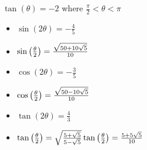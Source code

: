 \documentclass{ximera}
\begin{document}
\begin{question}
\begin{problem}
\begin{solution}
\begin{itemize}
\end{itemize}
\end{solution}
\end{problem}

\begin{problem}\label{doublehalflast}
$\tan(\theta) = -2$ where $\frac{\pi}{2} < \theta < \pi$

\begin{solution}
\begin{itemize}

\item $\sin(2\theta) = -\frac{4}{5}$
\item $\sin\left(\frac{\theta}{2}\right) = \frac{\sqrt{50+10\sqrt{5}}}{10} \\ \phantom{\tan\left(\frac{\theta}{2}\right) =\frac{5-5\sqrt{5}}{10}}$ 

\item $\cos(2\theta) = -\frac{3}{5}$
\item $\cos\left(\frac{\theta}{2}\right)= \frac{\sqrt{50-10\sqrt{5}}}{10} \\ \phantom{\tan\left(\frac{\theta}{2}\right) =\frac{5-5\sqrt{5}}{10}}$ 
\item $\tan(2\theta)=\frac{4}{3}$
\item $\tan\left(\frac{\theta}{2}\right) =  \sqrt{\frac{5+\sqrt{5}}{5-\sqrt{5}}} \\ \tan\left(\frac{\theta}{2}\right) =\frac{5+5\sqrt{5}}{10}$

\end{itemize}
\end{solution}
\end{problem}

\end{question}
\end{document}
